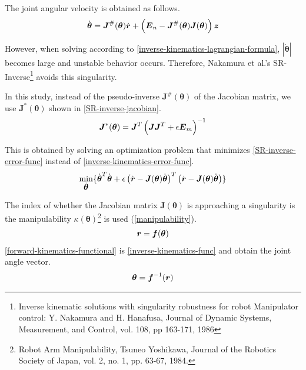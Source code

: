 The joint angular velocity is obtained as follows.
\begin{eqnarray}
 \dot{\bm{\theta}} = \bm{J}^{\#}(\bm{\theta})\dot{\bm{r}} + 
  \left(\bm{E}_n - \bm{J}^{\#}(\bm{\theta})\bm{J}(\bm{\theta})\right)\bm{z}
  \eqlabel{inverse-kinematics-lagrangian-formula}
\end{eqnarray}

However, when solving according to \eqref{inverse-kinematics-lagrangian-formula}, $\left|\dot{\bm{\theta}}\right|$ becomes large and unstable behavior occurs.
Therefore, Nakamura et al.'s SR-Inverse\footnote{Inverse kinematic solutions with singularity robustness for robot
Manipulator control: Y. Nakamura and H. Hanafusa, Journal of Dynamic Systems, Measurement, and Control, vol. 108, pp 163-171, 1986} avoids this singularity.

In this study, instead of the pseudo-inverse $\bm{J}^{\#}(\bm{\theta})$ of the Jacobian matrix, we use $\bm{J}^{*}(\bm{\theta})$ shown in \eqref{SR-inverse-jacobian}.
\begin{eqnarray}
 \bm{J}^{*}(\bm{\theta})
  = \bm{J}^T\left(\bm{J}\bm{J}^T + \epsilon \bm{E}_m\right)^{-1}
 \eqlabel{SR-inverse-jacobian}
\end{eqnarray}

This is obtained by solving an optimization problem that minimizes \eqref{SR-inverse-error-func} instead of \eqref{inverse-kinematics-error-func}.
\begin{eqnarray}
 \min_{\dot{\bm{\theta}}}
\{
 \dot{\bm{\theta}}^T \dot{\bm{\theta}}
+
\epsilon
\left(\dot{\bm{r}} - \bm{J}(\bm{\theta})\dot{\bm{\theta}}\right)^T
\left(\dot{\bm{r}} - \bm{J}(\bm{\theta})\dot{\bm{\theta}}\right)
\}
 \eqlabel{SR-inverse-error-func}
\end{eqnarray}

The index of whether the Jacobian matrix $\bm{J}(\bm{\theta})$ is approaching a singularity is the manipulability $\kappa(\bm{\theta})$\footnote{Robot Arm Manipulability, Tsuneo Yoshikawa, Journal of the Robotics Society of Japan, vol. 2, no. 1, pp. 63-67, 1984.} is used (\eqref{manipulability}).
\begin{eqnarray}
   \bm{r} = \bm{f}(\bm{\theta}) \eqlabel{forward-kinematics-functional}
\end{eqnarray}
\eqref{forward-kinematics-functional} is \eqref{inverse-kinematics-func}
and obtain the joint angle vector.
\begin{eqnarray}
  \bm{\theta} = \bm{f}^{-1}(\bm{r}) \eqlabel{inverse-kinematics-func}
\end{eqnarray}

